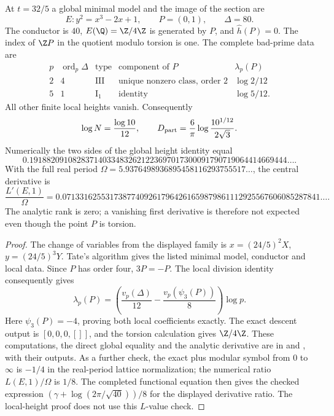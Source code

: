 \begin{proposition}\label{ari:C.6.T1}
At $t=32/5$ a global minimal model and the image of the section are
\[
 E:y^2=x^3-2x+1,\qquad P=(0,1),\qquad \Delta=80.
\]
The conductor is $40$, $E(\Q)=\Z/4\Z$ is generated by $P$,
and $\widehat h(P)=0$. The index of $\Z P$ in the quotient
modulo torsion is one. The complete bad-prime data are
\[
\begin{array}{c|c|c|c|c}
p&\operatorname{ord}_p\Delta&\text{type}&\text{component of }P&\lambda_p(P)\\\hline
2&4&\mathrm{III}&\text{unique nonzero class, order }2&\log2/12\\
5&1&\mathrm I_1&\text{identity}&\log5/12.
\end{array}
\]
All other finite local heights vanish. Consequently
\[
 \log N=\frac{\log10}{12},\qquad
 D_{\rm part}=\frac6\pi\log\frac{10^{1/12}}{2\sqrt3}.
\]
Numerically the two sides of the global height identity equal
\[
 0.191882091082837140334832621223697017300091790719064414669444\ldots.
\]
With the full real period $\Omega=5.9376498936895458116293755517\ldots$,
the central derivative is
\[
 \frac{L'(E,1)}\Omega=
 0.071331625531738774092617964261659879861112925567606085287841\ldots.
\]
The analytic rank is zero; a vanishing first derivative is therefore
not expected even though the point $P$ is torsion.
\end{proposition}

\begin{proof}
The change of variables from the displayed family is
$x=(24/5)^2X$, $y=(24/5)^3Y$. Tate's algorithm gives the
listed minimal model, conductor and local data. Since $P$ has
order four, $3P=-P$. The local division identity consequently
gives
\[
 \lambda_p(P)=\left(\frac{v_p(\Delta)}{12}
                         -\frac{v_p(\psi_3(P))}{8}\right)\log p.
\]
Here $\psi_3(P)=-4$, proving both local coefficients exactly.
The exact descent output is $[0,0,0,[]]$, and the torsion
calculation gives $\Z/4\Z$. These computations, the direct
global equality and the analytic derivative are in
 and
, with their outputs.
As a further check, the exact plus modular symbol from $0$ to
$\infty$ is $-1/4$ in the real-period lattice normalization;
the numerical ratio $L(E,1)/\Omega$ is $1/8$. The completed
functional equation then gives the checked expression
$(\gamma+\log(2\pi/\sqrt{40}))/8$ for the displayed derivative
ratio. The local-height proof does not use this $L$-value check.
\end{proof}

